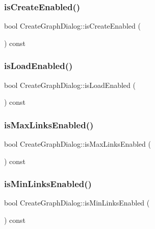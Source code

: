 \subsubsection{\texorpdfstring{isCreateEnabled()}{isCreateEnabled()}}
{\footnotesize\ttfamily bool Create\+Graph\+Dialog\+::is\+Create\+Enabled (\begin{DoxyParamCaption}{ }\end{DoxyParamCaption}) const}

\mbox{\label{class_create_graph_dialog_acd4a9edfb51bb3595dbb9a86c8233f38}} 
\subsubsection{\texorpdfstring{isLoadEnabled()}{isLoadEnabled()}}
{\footnotesize\ttfamily bool Create\+Graph\+Dialog\+::is\+Load\+Enabled (\begin{DoxyParamCaption}{ }\end{DoxyParamCaption}) const}

\mbox{\label{class_create_graph_dialog_afde046356f8feccee2d005f9fe1028bc}} 
\subsubsection{\texorpdfstring{isMaxLinksEnabled()}{isMaxLinksEnabled()}}
{\footnotesize\ttfamily bool Create\+Graph\+Dialog\+::is\+Max\+Links\+Enabled (\begin{DoxyParamCaption}{ }\end{DoxyParamCaption}) const}

\mbox{\label{class_create_graph_dialog_a18671167300e9f475399c52ea580796b}} 
\subsubsection{\texorpdfstring{isMinLinksEnabled()}{isMinLinksEnabled()}}
{\footnotesize\ttfamily bool Create\+Graph\+Dialog\+::is\+Min\+Links\+Enabled (\begin{DoxyParamCaption}{ }\end{DoxyParamCaption}) const}

